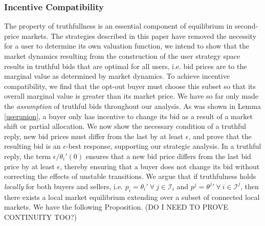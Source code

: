\documentclass[sigconf, anonymous]{acmart}
\newcommand{\mcI}{\mathcal{I}}
\theoremstyle{definition}
\begin{document}
\subsubsection{Incentive Compatibility}

The property of truthfullness is an essential component of equilibrium in
second-price markets. The strategies described in this paper have removed the
necessity for a user to determine its own valuation function, we intend to show that the market dynamics resulting from the
construction of the user strategy space results in truthful bids that are optimal for all users,
i.e. bid prices are to the marginal value as determined by market dynamics. 
To achieve incentive compatibility, we find that the opt-out buyer must choose
this subset so that its overall marginal value is greater than its market price.
We have so far only made the \emph{assumption} of truthful bids throughout our analysis. As was shown in Lemma \ref{userunion}, a buyer only
has incentive to change its bid as a result of a market shift or partial
allocation. We now show the necessary condition of a truthful reply, new bid
prices must differ from the last by at least $\epsilon$, and prove that the
resulting bid is an $\epsilon$-best response, supporting our strategic analysis.
In a truthful reply, the term $\epsilon/\theta_i'(0)$
ensures that a new bid price differs from the last bid price by at least
$\epsilon$, thereby ensuring that a buyer does not change its bid without
correcting the effects of unstable transitions.
We argue that if truthfulness holds \emph{locally} for both buyers and sellers, i.e. $p_i ={\theta_i}' \
\forall \ j \in \mcI_i$ and $p^j = {\theta^j}' \ \forall \ i \in\mcI^j$, then
there exists a local market equilibrium extending over a subset of connected
local markets. We have the following Proposition. 
(DO I NEED TO PROVE CONTINUITY TOO?)
\end{document}
